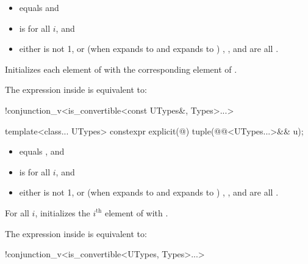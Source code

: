 \documentclass{wg21}
\begin{document}
\begin{itemdescr}
    \pnum
    \constraints
    \begin{itemize}
        \item
         equals  and
        
        \item
         is  for all $i$, and
        
        \item
        either
         is not 1, or
        (when  expands to  and  expands to )
        , , and  are all .
    \end{itemize}
    
    \pnum
    \effects
    Initializes each element of 
    with the corresponding element of .
    
    \pnum
    \remarks
    The expression inside  is equivalent to:
    \begin{codeblock}
        !conjunction_v<is_convertible<const UTypes&, Types>...>
    \end{codeblock}
\end{itemdescr}

%
\begin{itemdecl}
template<class... UTypes> 
constexpr explicit(@\seebelow@) tuple(@@<UTypes...>&& u);
\end{itemdecl}

\begin{itemdescr}
    \pnum
    \constraints
    \begin{itemize}
        \item
         equals , and
        
        \item
         is  for all $i$, and
        
        \item
        either
         is not 1, or
        (when  expands to  and  expands to )
        , ,
        and  are all .
    \end{itemize}
    
    \pnum
    \effects
    For all $i$,
    initializes the $i^\text{th}$ element of  with
    .
    
    \pnum
    \remarks
    The expression inside  is equivalent to:
    \begin{codeblock}
        !conjunction_v<is_convertible<UTypes, Types>...>
    \end{codeblock}
\end{itemdescr}
\end{document}
